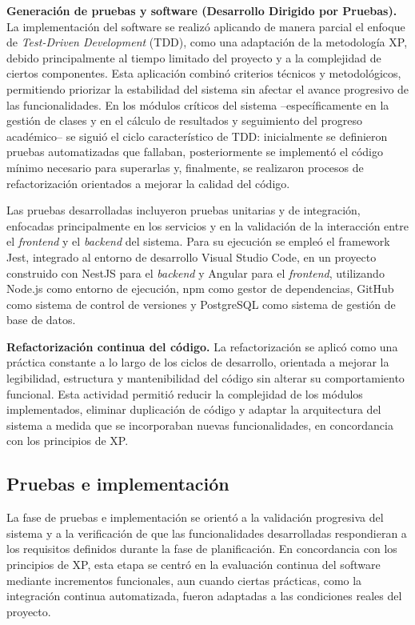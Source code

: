 \textbf{Generación de pruebas y software (Desarrollo Dirigido por Pruebas).} La implementación del software se realizó aplicando de manera parcial el enfoque de \textit{Test-Driven Development} (TDD), como una adaptación de la metodología XP, debido principalmente al tiempo limitado del proyecto y a la complejidad de ciertos componentes. Esta aplicación combinó criterios técnicos y metodológicos, permitiendo priorizar la estabilidad del sistema sin afectar el avance progresivo de las funcionalidades. En los módulos críticos del sistema --específicamente en la gestión de clases y en el cálculo de resultados y seguimiento del progreso académico-- se siguió el ciclo característico de TDD: inicialmente se definieron pruebas automatizadas que fallaban, posteriormente se implementó el código mínimo necesario para superarlas y, finalmente, se realizaron procesos de refactorización orientados a mejorar la calidad del código.

Las pruebas desarrolladas incluyeron pruebas unitarias y de integración, enfocadas principalmente en los servicios y en la validación de la interacción entre el \textit{frontend} y el \textit{backend} del sistema. Para su ejecución se empleó el framework Jest, integrado al entorno de desarrollo Visual Studio Code, en un proyecto construido con NestJS para el \textit{backend} y Angular para el \textit{frontend}, utilizando Node.js como entorno de ejecución, npm como gestor de dependencias, GitHub como sistema de control de versiones y PostgreSQL como sistema de gestión de base de datos.

\textbf{Refactorización continua del código.} La refactorización se aplicó como una práctica constante a lo largo de los ciclos de desarrollo, orientada a mejorar la legibilidad, estructura y mantenibilidad del código sin alterar su comportamiento funcional. Esta actividad permitió reducir la complejidad de los módulos implementados, eliminar duplicación de código y adaptar la arquitectura del sistema a medida que se incorporaban nuevas funcionalidades, en concordancia con los principios de XP.

\subsection{Pruebas e implementación}

La fase de pruebas e implementación se orientó a la validación progresiva del sistema y a la verificación de que las funcionalidades desarrolladas respondieran a los requisitos definidos durante la fase de planificación. En concordancia con los principios de XP, esta etapa se centró en la evaluación continua del software mediante incrementos funcionales, aun cuando ciertas prácticas, como la integración continua automatizada, fueron adaptadas a las condiciones reales del proyecto.

